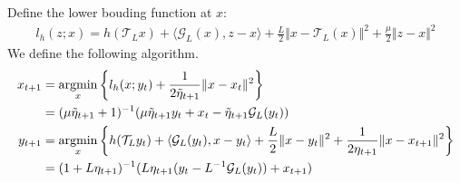 \documentclass[12pt]{article}
\begin{document}
    \begin{definition}\label{def:generic_s-cvx_form}
        Define the lower bouding function at $x$: 
        \begin{align*}
            l_h(z; x) = h(\mathcal T_L x) + \langle \mathcal G_L (x), z - x\rangle
            + 
            \frac{L}{2}\Vert x - \mathcal T_L (x)\Vert^2 + \frac{\mu}{2}\Vert z - x\Vert^2
        \end{align*}
        We define the following algorithm. 
        \begin{align*}
            x_{t + 1} &= \mathop{\rm argmin}\limits_{x} \left\lbrace
                l_h(x; y_t) + \frac{1}{2\tilde \eta_{t + 1}} 
                \Vert x - x_t\Vert^2 
            \right\rbrace
            \\
            &= (\mu\tilde \eta_{t + 1} + 1)^{-1} 
            (\mu\tilde \eta_{t + 1}y_t + x_t - \tilde \eta_{t + 1}\mathcal G_L(y_t))
            \\
            y_{t + 1}&= 
            \mathop{\rm argmin}\limits_{x}
            \left\lbrace
                h(\mathcal T_L y_t) + \langle \mathcal G_L(y_t), x - y_t\rangle + \frac{L}{2}\Vert x -y_t\Vert^2
                + \frac{1}{2\eta_{t + 1}}\Vert x - x_{t + 1}\Vert^2
            \right\rbrace
            \\
            &= (1 + L \eta_{t +1})^{-1}(L\eta_{t + 1}(y_t - L^{-1}\mathcal G_L(y_t)) + x_{t + 1})
        \end{align*}
    \end{definition}
\end{document}
